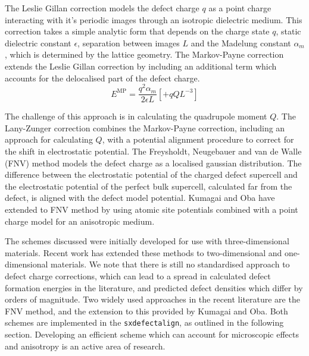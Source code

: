 The Leslie Gillan correction\cite{Leslie1985} models the defect charge $q$ as a point charge interacting with it's periodic images through an isotropic dielectric medium. 
This correction takes a simple analytic form that depends on the charge state  $q$, static dielectric constant $\epsilon$, separation between images $L$ and the Madelung constant $\alpha_m$, which is determined by the lattice geometry.
The Markov-Payne correction extends the Leslie Gillan correction by including an additional term which accounts for the delocalised part of the defect charge. 
\begin{equation}
    E^\mathrm{MP} = \frac{q^2\alpha_{m}}{2\epsilon L} [+ qQL^{-3}]
\end{equation}

The challenge of this approach is in calculating the quadrupole moment $Q$. 
The Lany-Zunger correction\cite{Lany2009} combines the Markov-Payne correction, including an approach for calculating $Q$, with a potential alignment procedure to correct for the shift in electrostatic potential. 
The Freysholdt, Neugebauer and van de Walle (FNV) method\cite{Freysoldt2009} models the defect charge as a localised gaussian distribution. 
The difference between the electrostatic potential of the charged defect supercell and the electrostatic potential of the perfect bulk supercell, calculated far from the defect, is aligned with the defect model potential. 
Kumagai and Oba have extended to FNV method by using atomic site potentials combined with a point charge model for an anisotropic medium.\cite{Kumagai2014} 

The schemes discussed were initially developed for use with three-dimensional materials. 
Recent work has extended these methods to two-dimensional\cite{Freysoldt2018,Komsa2013} and one-dimensional\cite{Kim2014} materials.
We note that there is still no standardised approach to defect charge corrections, 
which can lead to a spread in calculated defect formation energies in the literature, and predicted defect densities which differ by orders of magnitude.
Two widely used approaches in the recent literature are the FNV method, and the extension to this provided by Kumagai and Oba.
Both schemes are implemented in the \texttt{sxdefectalign}, as outlined in the following section.
Developing an efficient scheme which can account for microscopic effects and anisotropy is an active area of research.\cite{durrant2018,Vinichenko2017}


